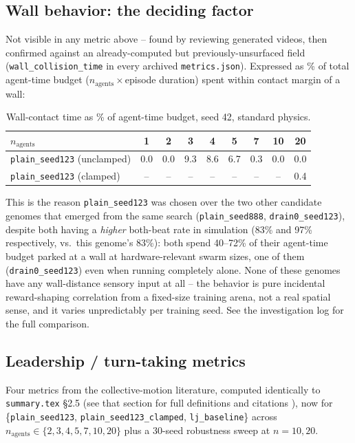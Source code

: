 \documentclass[11pt]{article}
\begin{document}
\subsection{Wall behavior: the deciding factor}
\label{sec:wall}
Not visible in any metric above -- found by reviewing generated videos, then confirmed against
an already-computed but previously-unsurfaced field (\texttt{wall\_collision\_time} in every
archived \texttt{metrics.json}). Expressed as \% of total agent-time budget
($n_{\text{agents}}\times$episode duration) spent within contact margin of a wall:

\begin{table}[h]
\centering
\caption{Wall-contact time as \% of agent-time budget, seed 42, standard physics.}
\begin{tabular}{@{}lcccccccc@{}}
\toprule
$n_{\text{agents}}$ & 1 & 2 & 3 & 4 & 5 & 7 & 10 & 20 \\
\midrule
\texttt{plain\_seed123} (unclamped) & 0.0 & 0.0 & 9.3 & 8.6 & 6.7 & 0.3 & 0.0 & 0.0 \\
\texttt{plain\_seed123} (clamped) & -- & -- & -- & -- & -- & -- & -- & 0.4\footnotemark \\
\bottomrule
\end{tabular}
\end{table}

\noindent This is the reason \texttt{plain\_seed123} was chosen over the two other candidate
genomes that emerged from the same search (\texttt{plain\_seed888}, \texttt{drain0\_seed123}),
despite both having a \emph{higher} both-beat rate in simulation (83\% and 97\% respectively,
vs.\ this genome's 83\%): both spend 40--72\% of their agent-time budget parked at a wall at
hardware-relevant swarm sizes, one of them (\texttt{drain0\_seed123}) even when running
completely alone. None of these genomes have any wall-distance sensory input at all -- the
behavior is pure incidental reward-shaping correlation from a fixed-size training arena, not a
real spatial sense, and it varies unpredictably per training seed. See the investigation log
for the full comparison.

\subsection{Leadership / turn-taking metrics}
\label{sec:leadership}
Four metrics from the collective-motion literature, computed identically to
\texttt{summary.tex} \S2.5 (see that section for full definitions and citations
\cite{voelkl2015,nagy2010,mirzaeinia2019,butail2019}), now for
\{\texttt{plain\_seed123}, \texttt{plain\_seed123\_clamped}, \texttt{lj\_baseline}\} across
$n_{\text{agents}}\in\{2,3,4,5,7,10,20\}$ plus a 30-seed robustness sweep at $n{=}10,20$.
\end{document}
